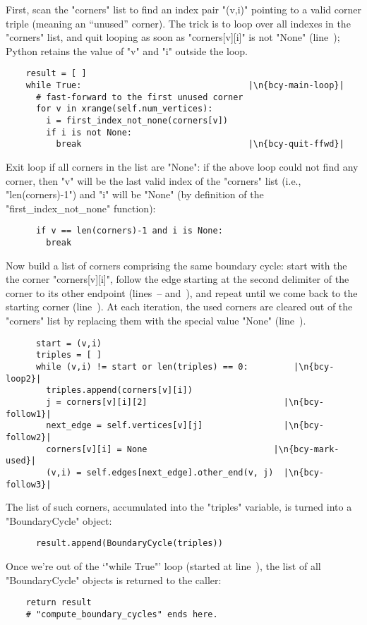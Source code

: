 First, scan the "corners" list to find an index pair "(v,i)" pointing
to a valid corner triple (meaning an ``unused'' corner). The trick is
to loop over all indexes in the "corners" list, and quit looping as
soon as "corners[v][i]" is not "None" (line~);
Python retains the value of "v" and "i" outside the loop.
\begin{lstlisting}
    result = [ ]
    while True:                                 |\n{bcy-main-loop}|
      # fast-forward to the first unused corner
      for v in xrange(self.num_vertices):
        i = first_index_not_none(corners[v])
        if i is not None:
          break                                 |\n{bcy-quit-ffwd}|

\end{lstlisting}
Exit loop if all corners in the list are "None": if the above loop
could not find any corner, then "v" will be the last valid index of
the "corners" list (i.e., "len(corners)-1") and "i" will be "None" (by
definition of the "first_index_not_none" function):
\begin{lstlisting}
      if v == len(corners)-1 and i is None:
        break

\end{lstlisting}
Now build a list of corners comprising the same boundary cycle: start
with the the corner "corners[v][i]", follow the edge starting at the
second delimiter of the corner to its other endpoint
(lines~-- and~), and
repeat until we come back to the starting corner
(line~). At each iteration, the used corners are cleared
out of the "corners" list by replacing them with the special value
"None" (line~).
\begin{lstlisting}
      start = (v,i)
      triples = [ ]
      while (v,i) != start or len(triples) == 0:         |\n{bcy-loop2}|
        triples.append(corners[v][i])
        j = corners[v][i][2]                           |\n{bcy-follow1}|
        next_edge = self.vertices[v][j]                |\n{bcy-follow2}|
        corners[v][i] = None                         |\n{bcy-mark-used}|
        (v,i) = self.edges[next_edge].other_end(v, j)  |\n{bcy-follow3}|
\end{lstlisting}
The list of such corners, accumulated into the "triples" variable, is
turned into a "BoundaryCycle" object:
\begin{lstlisting}
      result.append(BoundaryCycle(triples))

\end{lstlisting}
Once we're out of the `"while True"' loop (started at
line~), the list of all "BoundaryCycle" objects
is returned to the caller:
\begin{lstlisting}
    return result
    # "compute_boundary_cycles" ends here.
    
\end{lstlisting}

